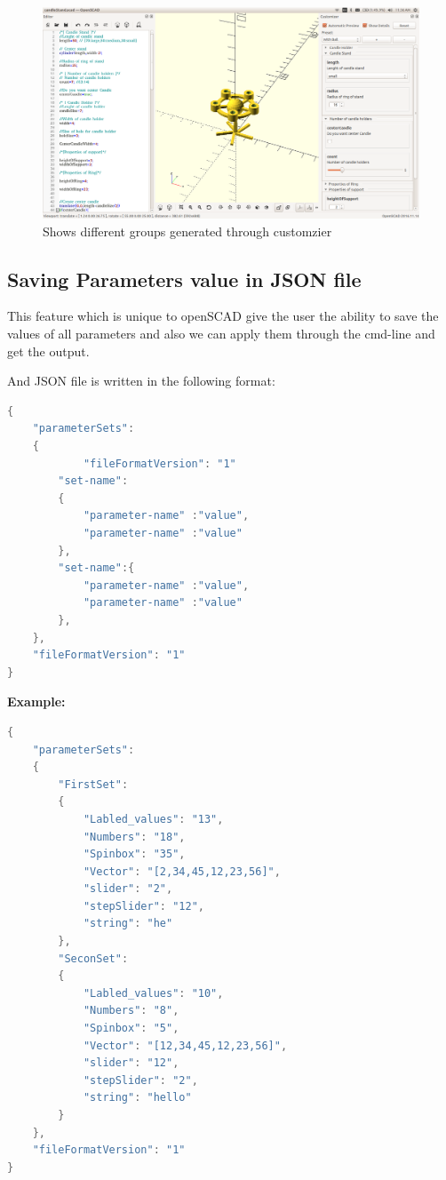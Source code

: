 \begin{figure}
    \centering \includegraphics[width=\linewidth]{images/output/6.png}
    \caption{Shows different groups generated through customzier}
    \label{fig:5}
\end{figure}

\subsection{ Saving Parameters value in JSON file}
This feature which is unique to openSCAD give the user the ability to save the values of all parameters and also we can apply them through the cmd-line and get the output.

And JSON file is written in the following format:

\begin{lstlisting}[language=Java]
{
    "parameterSets":
    {
            "fileFormatVersion": "1"
        "set-name":
        {
            "parameter-name" :"value",
            "parameter-name" :"value"
        },
        "set-name":{
            "parameter-name" :"value",
            "parameter-name" :"value"
        },
    },
    "fileFormatVersion": "1"
}
\end{lstlisting}

\textbf{Example:}
\begin{lstlisting}[language=Java]
{
    "parameterSets":
    {
        "FirstSet":
        {
            "Labled_values": "13",
            "Numbers": "18",
            "Spinbox": "35",
            "Vector": "[2,34,45,12,23,56]",
            "slider": "2",
            "stepSlider": "12",
            "string": "he"
        },
        "SeconSet":
        {
            "Labled_values": "10",
            "Numbers": "8",
            "Spinbox": "5",
            "Vector": "[12,34,45,12,23,56]",
            "slider": "12",
            "stepSlider": "2",
            "string": "hello"
        }
    },
    "fileFormatVersion": "1"
}
\end{lstlisting}

